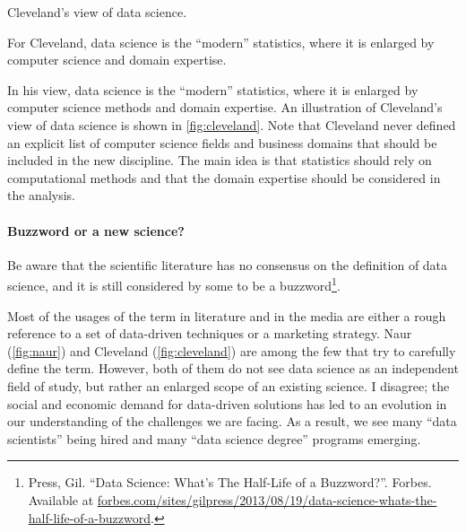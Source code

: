 \begin{figurebox}[label=fig:cleveland]{Cleveland's view of data science.}
  \centering
  \tcblower
    For Cleveland, data science is the ``modern'' statistics,
    where it is enlarged by computer science and domain expertise.
\end{figurebox}

In his view, data science is the ``modern'' statistics, where it is enlarged by computer
science methods and domain expertise.  An illustration of Cleveland's view of data science
is shown in \cref{fig:cleveland}.  Note that Cleveland never defined an
explicit list of computer science fields and business domains that should be included in
the new discipline.  The main idea is that statistics should rely on computational methods
and that the domain expertise should be considered in the analysis.

\paragraph{Buzzword or a new science?}

Be aware that the scientific literature has no consensus on the definition of data science, and it is still considered
by some to be a buzzword\footnote{Press, Gil. ``Data Science: What's The Half-Life of a
Buzzword?''. Forbes. Available at
\href{https://www.forbes.com/sites/gilpress/2013/08/19/data-science-whats-the-half-life-of-a-buzzword/}%
  {forbes.com/sites/gilpress/2013/08/19/data-science-whats-the-half-life-of-a-buzzword}.}.

Most of the usages of the term in literature and in the media are either a rough
reference to a set of data-driven techniques or a marketing strategy.  Naur
(\cref{fig:naur}) and Cleveland (\cref{fig:cleveland}) are among the few that try to
carefully define the term.  However, both of them do not see data science as an
independent field of study, but rather an enlarged scope of an existing science.  I disagree;
the social and economic demand for data-driven solutions has led to an evolution in our
understanding of the challenges we are facing.  As a result, we see many ``data
scientists'' being hired and many ``data science degree'' programs emerging.

